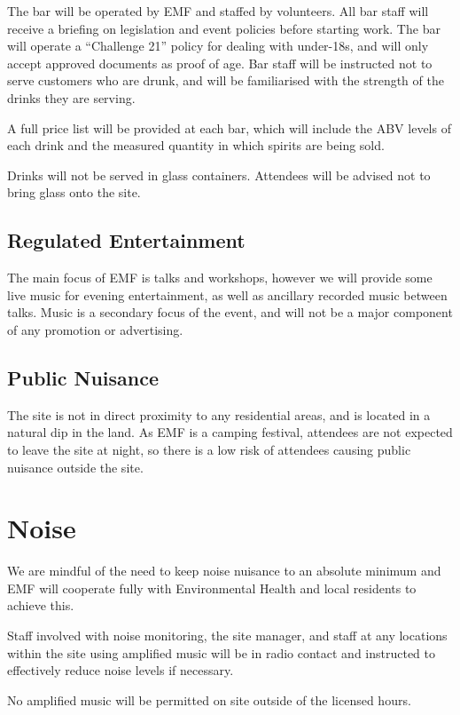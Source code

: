 The bar will be operated by EMF and staffed by volunteers. All bar staff will receive a
briefing on legislation and event policies before starting work. The bar will operate a
``Challenge 21'' policy for dealing with under-18s, and will only accept
approved documents as proof of age. Bar staff will be instructed not to serve customers who are
drunk, and will be familiarised with the strength of the drinks they are serving.

A full price list will be provided at each bar, which will include the ABV levels of each drink
and the measured quantity in which spirits are being sold.

Drinks will not be served in glass containers. Attendees will be advised not to bring
glass onto the site.

\subsection{Regulated Entertainment}

The main focus of EMF is talks and workshops, however we will provide some live music for evening
entertainment, as well as ancillary recorded music between talks. Music is a secondary focus of the
event, and will not be a major component of any promotion or advertising.

\subsection{Public Nuisance}

The site is not in direct proximity to any residential areas, and is located in a
natural dip in the land. As EMF is a camping festival, attendees are not expected to leave the site
at night, so there is a low risk of attendees causing public nuisance outside the site.

\section{Noise}

We are mindful of the need to keep noise nuisance to an absolute minimum and EMF will cooperate fully
with Environmental Health and local residents to achieve this.

Staff involved with noise monitoring, the site manager, and staff at any locations within the site
using amplified music will be in radio contact and instructed to effectively reduce noise levels if
necessary.

No amplified music will be permitted on site outside of the licensed hours.

